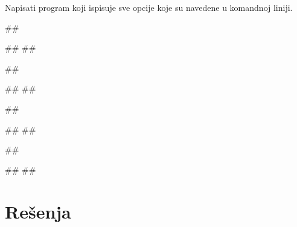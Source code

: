 \begin{Exercise}[label=v2.2_01] 
 Napisati program koji ispisuje sve opcije koje su navedene u komandnoj liniji.
 
\begin{miditest}
\begin{upotreba}{1}
##

#\naslovIzlaz#
##
\end{upotreba}
\end{miditest}
\begin{miditest}
\begin{upotreba}{2}
##

#\naslovIzlaz#
##
\end{upotreba}
\end{miditest}

\begin{miditest}
\begin{upotreba}{3}
##

#\naslovIzlaz#
##
\end{upotreba}
\end{miditest}
\begin{miditest}
\begin{upotreba}{4}
##

#\naslovIzlaz#
##
\end{upotreba}
\end{miditest}

\end{Exercise}
\ifresenja
\begin{Answer}[ref=v2.2_01]
\end{Answer}
 \fi


\ifresenja
\section{Rešenja}
\shipoutAnswer
\fi
